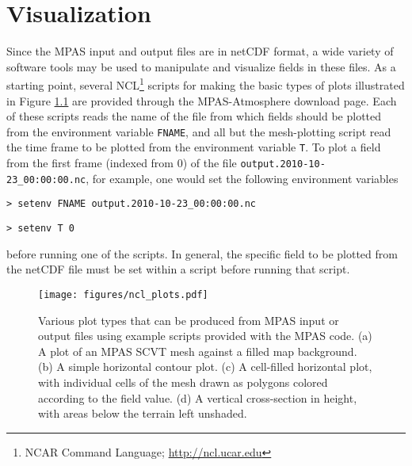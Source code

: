
\chapter{Visualization}
\label{chap:atmosphere_visualization}

Since the MPAS input and output files are in netCDF format, a wide variety of software
tools may be used to manipulate and visualize fields in these files. As a starting point, several NCL\footnote{NCAR Command Language; \url{http://ncl.ucar.edu}}
scripts for making the basic types of plots illustrated in Figure \ref{fig:ncl_plots} are provided through the MPAS-Atmosphere download page. Each of
these scripts reads the name of the file from which fields should be plotted from the environment variable {\tt FNAME},
and all but the mesh-plotting script read the time frame to be plotted from the environment variable {\tt T}. To plot
a field from the first frame (indexed from 0) of the file {\tt output.2010-10-23\_00:00:00.nc}, for example, one would set the 
following environment variables 

\vspace{12pt}
{\tt > setenv FNAME output.2010-10-23\_00:00:00.nc}

{\tt > setenv T 0}
\vspace{12pt}

\noindent before running one of the scripts. In general, the specific field to be plotted from the netCDF file must be set 
within a script before running that script. 

\begin{figure}[htb]
\begin{center}
\texttt{[image: figures/ncl\_plots.pdf]}
\caption{Various plot types that can be produced from MPAS input or output files using example scripts provided with the MPAS code.
(a) A plot of an MPAS SCVT mesh against a filled map background. (b) A simple horizontal contour plot. (c) A cell-filled horizontal plot, with
individual cells of the mesh drawn as polygons colored according to the field value. (d) A vertical cross-section in height, with areas below the
terrain left unshaded.}
\label{fig:ncl_plots}
\end{center}
\end{figure}


